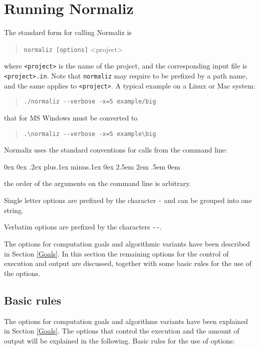 \documentclass[12pt,a4paper]{scrartcl}
\newcounter{listi}
\newcommand{\stdli}{ \topsep0ex \partopsep0ex %
\parsep.2ex plus.1ex minus.1ex \itemsep0ex%
\leftmargin2.5em \labelwidth2em \labelsep.5em \rightmargin0em}%
\newenvironment{arab}{\begin{list}{\textup{(\arabic{listi})}}%
	{\usecounter{listi}\stdli}}{\end{list}}
\theoremstyle{definition}
\begin{document}
\section{Running Normaliz}\label{options}

The standard form for  calling Normaliz is
\begin{quote}
	\verb|normaliz [options]| <project>
\end{quote}
where \verb|<project>| is the name of the project, and the corresponding input file is \verb|<project>.in|. Note that \verb|normaliz| may require to be prefixed by a path name, and the same applies to \verb|<project>|. A typical example on a Linux or Mac system:
\begin{quote}
	\verb|./normaliz --verbose -x=5 example/big|
\end{quote}
that for MS Windows must be converted to
\begin{quote}
	\verb|.\normaliz --verbose -x=5 example\big|
\end{quote}

Normaliz uses the standard conventions for calls from the command line:
\begin{arab}
	\item the order of the arguments on the command line is arbitrary.
	\item Single letter options are prefixed by the character \verb|-| and can be grouped into one string.
	\item Verbatim options are prefixed by the characters \verb|--|.
\end{arab}

The options for computation goals and algorithmic variants have been described in Section \ref{Goals}. In this section the remaining options for the control of execution and output are discussed, together with some basic rules for the use of the options.

\subsection{Basic rules}
The options for computation goals and algorithms variants have been explained in Section \ref{Goals}. The options that control the execution and the amount of output will be explained in the following. Basic rules for the use of options:
\end{document}
